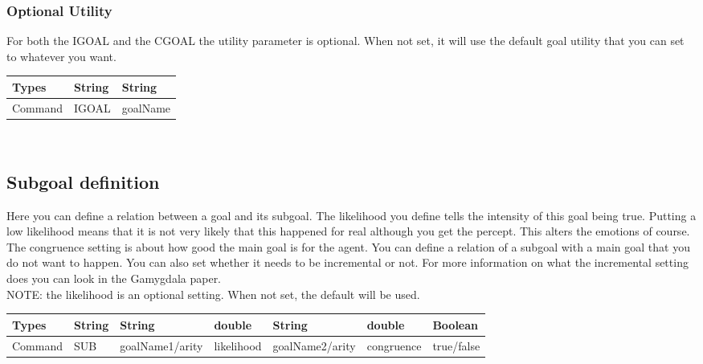 \documentclass{scrartcl}
\begin{document}
\subsubsection{Optional Utility}
For both the IGOAL and the CGOAL the utility parameter is optional. When not set, it will use the default goal utility that you can set to whatever you want.\\
\begin{tabular}{|l|l|l|}
	\hline  Types& String & String  \\ 
	\hline  Command & IGOAL & goalName \\ 
	\hline 
\end{tabular}
\\


\subsection{Subgoal definition}
Here you can define a relation between a goal and its subgoal. The likelihood you define tells the intensity of this goal being true. Putting a low likelihood means that it is not very likely that this happened for real although you get the percept. This alters the emotions of course. The congruence setting is about how good the main goal is for the agent. You can define a relation of a subgoal with a main goal that you do not want to happen. You can also set whether it needs to be incremental or not. For more information on what the incremental setting does you can look in the Gamygdala paper.\\
NOTE: the likelihood is an optional setting. When not set, the default will be used.
\begin{tabular}{|l|l|l|l|l|l|l|}
	\hline  Types& String & String & double & String & double & Boolean \\ 
	\hline  Command & SUB & goalName1/arity & likelihood & goalName2/arity & congruence & true/false\\ 
	\hline 
\end{tabular} 
\\
\end{document}
